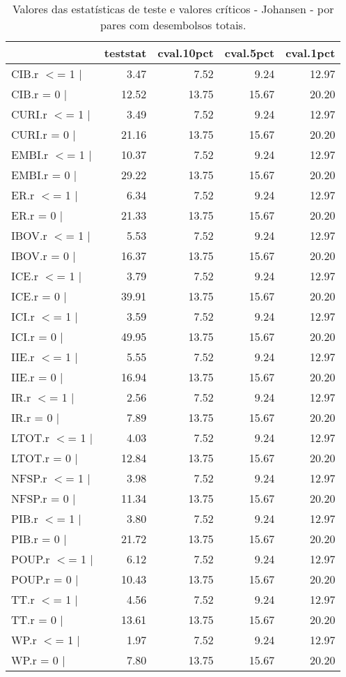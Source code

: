\begin{table}[!htb]
\centering
\caption{Valores das estat\'{i}sticas de teste e valores cr\'{i}ticos - Johansen - por pares com desembolsos totais.} 
\label{tab:cointegration-by2-1}
\begin{tabular}{lrrrr}
  \toprule
 & teststat & cval.10pct & cval.5pct & cval.1pct \\ 
  \midrule
CIB.r $<$= 1 $|$ & 3.47 & 7.52 & 9.24 & 12.97 \\ 
  CIB.r = 0  $|$ & 12.52 & 13.75 & 15.67 & 20.20 \\ 
  CURI.r $<$= 1 $|$ & 3.49 & 7.52 & 9.24 & 12.97 \\ 
  CURI.r = 0  $|$ & 21.16 & 13.75 & 15.67 & 20.20 \\ 
  EMBI.r $<$= 1 $|$ & 10.37 & 7.52 & 9.24 & 12.97 \\ 
  EMBI.r = 0  $|$ & 29.22 & 13.75 & 15.67 & 20.20 \\ 
  ER.r $<$= 1 $|$ & 6.34 & 7.52 & 9.24 & 12.97 \\ 
  ER.r = 0  $|$ & 21.33 & 13.75 & 15.67 & 20.20 \\ 
  IBOV.r $<$= 1 $|$ & 5.53 & 7.52 & 9.24 & 12.97 \\ 
  IBOV.r = 0  $|$ & 16.37 & 13.75 & 15.67 & 20.20 \\ 
  ICE.r $<$= 1 $|$ & 3.79 & 7.52 & 9.24 & 12.97 \\ 
  ICE.r = 0  $|$ & 39.91 & 13.75 & 15.67 & 20.20 \\ 
  ICI.r $<$= 1 $|$ & 3.59 & 7.52 & 9.24 & 12.97 \\ 
  ICI.r = 0  $|$ & 49.95 & 13.75 & 15.67 & 20.20 \\ 
  IIE.r $<$= 1 $|$ & 5.55 & 7.52 & 9.24 & 12.97 \\ 
  IIE.r = 0  $|$ & 16.94 & 13.75 & 15.67 & 20.20 \\ 
  IR.r $<$= 1 $|$ & 2.56 & 7.52 & 9.24 & 12.97 \\ 
  IR.r = 0  $|$ & 7.89 & 13.75 & 15.67 & 20.20 \\ 
  LTOT.r $<$= 1 $|$ & 4.03 & 7.52 & 9.24 & 12.97 \\ 
  LTOT.r = 0  $|$ & 12.84 & 13.75 & 15.67 & 20.20 \\ 
  NFSP.r $<$= 1 $|$ & 3.98 & 7.52 & 9.24 & 12.97 \\ 
  NFSP.r = 0  $|$ & 11.34 & 13.75 & 15.67 & 20.20 \\ 
  PIB.r $<$= 1 $|$ & 3.80 & 7.52 & 9.24 & 12.97 \\ 
  PIB.r = 0  $|$ & 21.72 & 13.75 & 15.67 & 20.20 \\ 
  POUP.r $<$= 1 $|$ & 6.12 & 7.52 & 9.24 & 12.97 \\ 
  POUP.r = 0  $|$ & 10.43 & 13.75 & 15.67 & 20.20 \\ 
  TT.r $<$= 1 $|$ & 4.56 & 7.52 & 9.24 & 12.97 \\ 
  TT.r = 0  $|$ & 13.61 & 13.75 & 15.67 & 20.20 \\ 
  WP.r $<$= 1 $|$ & 1.97 & 7.52 & 9.24 & 12.97 \\ 
  WP.r = 0  $|$ & 7.80 & 13.75 & 15.67 & 20.20 \\ 
   \bottomrule
\end{tabular}
\end{table}
